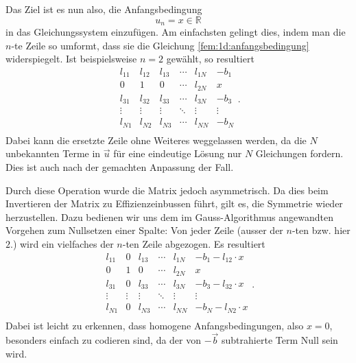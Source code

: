 Das Ziel ist es nun also, die Anfangsbedingung
\begin{equation}
    u_n = x \in \mathbb{R} 
    \label{fem:1d:anfangsbedingung}
\end{equation}
in das Gleichungssystem einzufügen.
Am einfachsten gelingt dies, indem man die $n$-te Zeile so umformt, dass sie die Gleichung \ref{fem:1d:anfangsbedingung} widerspiegelt.
Ist beispielsweise $n = 2$ gewählt, so resultiert
\begin{equation}
    \boxed{
        \begin{matrix}
            l_{11} & l_{12} & l_{13} & \cdots & l_{1N} & -b_1   \\
            0      & 1      & 0      & \cdots & l_{2N} & x      \\
            l_{31} & l_{32} & l_{33} & \cdots & l_{3N} & -b_3   \\
            \vdots & \vdots & \vdots & \ddots & \vdots & \vdots \\
            l_{N1} & l_{N2} & l_{N3} & \cdots & l_{NN} & -b_N   \\
        \end{matrix}
    }.
\end{equation}
Dabei kann die ersetzte Zeile ohne Weiteres weggelassen werden, da die $N$ unbekannten Terme in $\vec{u}$ für eine eindeutige Lösung nur $N$ Gleichungen fordern. 
Dies ist auch nach der gemachten Anpassung der Fall.

Durch diese Operation wurde die Matrix jedoch asymmetrisch. Da dies beim Invertieren der Matrix zu Effizienzeinbussen führt, gilt es, die Symmetrie wieder herzustellen.
Dazu bedienen wir uns dem im Gauss-Algorithmus angewandten Vorgehen zum Nullsetzen einer Spalte: Von jeder Zeile (ausser der $n$-ten bzw. hier $2$.) wird ein vielfaches der $n$-ten Zeile abgezogen.
Es resultiert
\begin{equation}
    \boxed{
        \begin{matrix}
            l_{11} & 0      & l_{13} & \cdots & l_{1N} & -b_1 - l_{12} \cdot x \\
            0      & 1      & 0      & \cdots & l_{2N} & x                     \\
            l_{31} & 0      & l_{33} & \cdots & l_{3N} & -b_3 - l_{32} \cdot x \\
            \vdots & \vdots & \vdots & \ddots & \vdots & \vdots                \\
            l_{N1} & 0      & l_{N3} & \cdots & l_{NN} & -b_N - l_{N2} \cdot x \\
        \end{matrix}
    }.
\end{equation}
Dabei ist leicht zu erkennen, dass homogene Anfangsbedingungen, also $x=0$, besonders einfach zu codieren sind, da der von $-\vec{b}$ subtrahierte Term Null sein wird.

